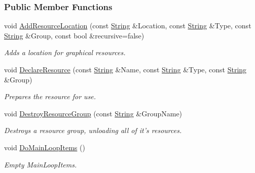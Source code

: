 \subsubsection*{Public Member Functions}
\begin{DoxyCompactItemize}
\item 
void \hyperlink{classMezzanine_1_1ResourceManager_a0c94a75cc5136f857447500aa4d6265b}{AddResourceLocation} (const \hyperlink{namespaceMezzanine_acf9fcc130e6ebf08e3d8491aebcf1c86}{String} \&Location, const \hyperlink{namespaceMezzanine_acf9fcc130e6ebf08e3d8491aebcf1c86}{String} \&Type, const \hyperlink{namespaceMezzanine_acf9fcc130e6ebf08e3d8491aebcf1c86}{String} \&Group, const bool \&recursive=false)
\begin{DoxyCompactList}\small\item\em Adds a location for graphical resources. \item\end{DoxyCompactList}\item 
void \hyperlink{classMezzanine_1_1ResourceManager_ab9e13ac880017cac65c57d1ccae008c4}{DeclareResource} (const \hyperlink{namespaceMezzanine_acf9fcc130e6ebf08e3d8491aebcf1c86}{String} \&Name, const \hyperlink{namespaceMezzanine_acf9fcc130e6ebf08e3d8491aebcf1c86}{String} \&Type, const \hyperlink{namespaceMezzanine_acf9fcc130e6ebf08e3d8491aebcf1c86}{String} \&Group)
\begin{DoxyCompactList}\small\item\em Prepares the resource for use. \item\end{DoxyCompactList}\item 
void \hyperlink{classMezzanine_1_1ResourceManager_aa827efdad18698b7d7319dab35864bbe}{DestroyResourceGroup} (const \hyperlink{namespaceMezzanine_acf9fcc130e6ebf08e3d8491aebcf1c86}{String} \&GroupName)
\begin{DoxyCompactList}\small\item\em Destroys a resource group, unloading all of it's resources. \item\end{DoxyCompactList}\item 
void \hyperlink{classMezzanine_1_1ResourceManager_a57b72306ed2bfaa198ff47d43c4013fa}{DoMainLoopItems} ()
\begin{DoxyCompactList}\small\item\em Empty MainLoopItems. \item\end{DoxyCompactList}\item 

\end{DoxyCompactItemize}
